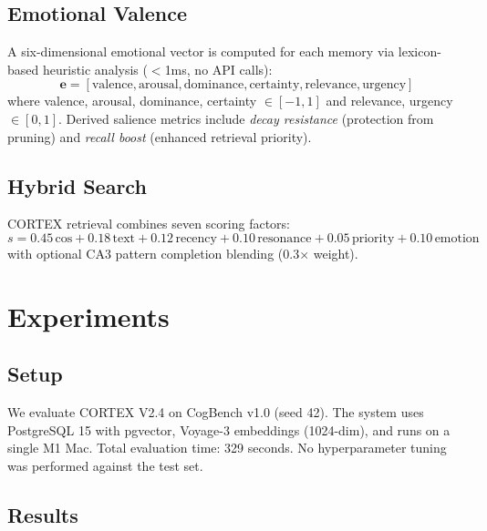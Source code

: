\documentclass{article}
\begin{document}
\subsection{Emotional Valence}

A six-dimensional emotional vector is computed for each memory via lexicon-based heuristic analysis ($<$1ms, no API calls):
\begin{equation}
\mathbf{e} = [\text{valence}, \text{arousal}, \text{dominance}, \text{certainty}, \text{relevance}, \text{urgency}]
\end{equation}
where valence, arousal, dominance, certainty $\in [-1, 1]$ and relevance, urgency $\in [0, 1]$. Derived salience metrics include \emph{decay resistance} (protection from pruning) and \emph{recall boost} (enhanced retrieval priority).

\subsection{Hybrid Search}

CORTEX retrieval combines seven scoring factors:
\begin{equation}
s = 0.45\,\text{cos} + 0.18\,\text{text} + 0.12\,\text{recency} + 0.10\,\text{resonance} + 0.05\,\text{priority} + 0.10\,\text{emotion}
\end{equation}
with optional CA3 pattern completion blending (0.3$\times$ weight).

\section{Experiments}
\label{sec:experiments}

\subsection{Setup}

We evaluate CORTEX V2.4 on CogBench v1.0 (seed 42). The system uses PostgreSQL 15 with pgvector, Voyage-3 embeddings (1024-dim), and runs on a single M1 Mac. Total evaluation time: 329 seconds. No hyperparameter tuning was performed against the test set.

\subsection{Results}
\end{document}
